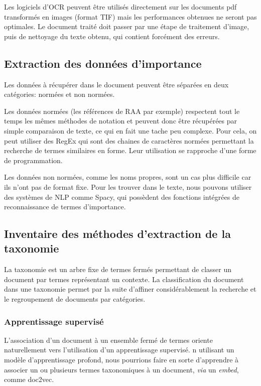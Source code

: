 Les logiciels d'OCR peuvent être utilisés directement sur les documents pdf transformés en images (format TIF) mais les performances obtenues ne seront pas optimales.
Le document traité doit passer par une étape de traitement d'image, puis de nettoyage du texte obtenu, qui contient forcément des erreurs.

\subsection{Extraction des données d'importance}
Les données à récupérer dans le document peuvent être séparées en deux catégories: normées et non normées.

Les données normées (les références de RAA par exemple) respectent tout le temps les mêmes méthodes de notation et peuvent donc être récupérées par simple comparaison de texte, ce qui en fait une tache peu complexe.
Pour cela, on peut utiliser des RegEx qui sont des chaines de caractères normées permettant la recherche de termes similaires en forme.
Leur utilisation se rapproche d'une forme de programmation.

Les données non normées, comme les noms propres, sont un cas plus difficile car ils n'ont pas de format fixe.
Pour les trouver dans le texte, nous pouvons utiliser des systèmes de \gls{NLP} comme Spacy, qui possèdent des fonctions intégrées de reconnaissance de termes d'importance.


\subsection{Inventaire des méthodes d'extraction de la taxonomie}
La taxonomie est un arbre fixe de termes fermés permettant de classer un document par termes représentant un contexte.
La classification du document dans une taxonomie permet par la suite d'affiner considérablement la recherche et le regroupement de documents par catégories.

\subsubsection{Apprentissage supervisé}
L'association d'un document à un ensemble fermé de termes oriente naturellement vers l'utilisation d'un apprentissage supervisé.
n utilisant un modèle d'apprentissage profond, nous pourrions faire en sorte d'apprendre à associer un ou plusieurs termes taxonomiques à un document, \textit{via} un \textit{\gls{embed}}, comme doc2vec\cite{doc2vec}.

